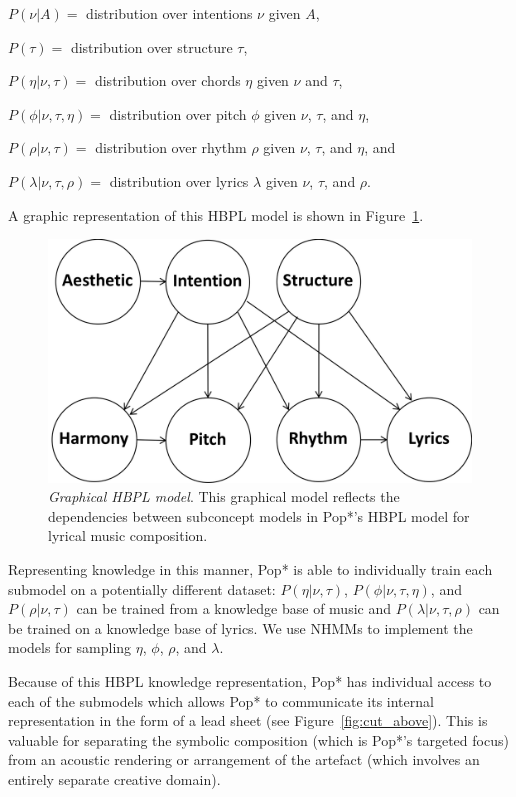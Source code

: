 \documentclass[phd,electronic,oneside,twosidetoc,letterpaper,chaptercenter,parttop,lof,lot]{byumsphd}
\begin{document}
\(P(\nu|A)=\) distribution over intentions $\nu$ given $A$,

\(P(\tau)=\) distribution over structure $\tau$,

\(P(\eta|\nu,\tau)=\) distribution over chords $\eta$ given $\nu$ and $\tau$,

\(P(\phi|\nu,\tau,\eta)=\) distribution over pitch $\phi$ given $\nu$, $\tau$, and $\eta$, 

\(P(\rho|\nu,\tau)=\) distribution over rhythm $\rho$ given $\nu$, $\tau$, and $\eta$, and

\(P(\lambda|\nu,\tau,\rho)=\) distribution over lyrics $\lambda$ given $\nu$, $\tau$, and $\rho$.

\noindent A graphic representation of this HBPL model is shown in Figure~\ref{fig:graphical_model}.

\begin{figure}
    \centering
    \includegraphics[width=.6\linewidth]{graphical_model}
    \caption{\textit{Graphical HBPL model}. This graphical model reflects the dependencies between subconcept models in Pop*'s HBPL model for lyrical music composition.}
    \label{fig:graphical_model}
\end{figure}

Representing knowledge in this manner, Pop* is able to individually train each submodel on a potentially different dataset: $P(\eta|\nu,\tau)$, $P(\phi|\nu,\tau,\eta)$, and $P(\rho|\nu,\tau)$ can be trained from a knowledge base of music and $P(\lambda|\nu,\tau,\rho)$ can be trained on a knowledge base of lyrics. We use NHMMs to implement the models for sampling $\eta$, $\phi$, $\rho$, and $\lambda$. 

Because of this HBPL knowledge representation, Pop* has individual access to each of the submodels which allows Pop* to communicate its internal representation in the form of a lead sheet (see Figure~\ref{fig:cut_above}). This is valuable for separating the symbolic composition (which is Pop*'s targeted focus) from an acoustic rendering or arrangement of the artefact (which involves an entirely separate creative domain).
\end{document}
